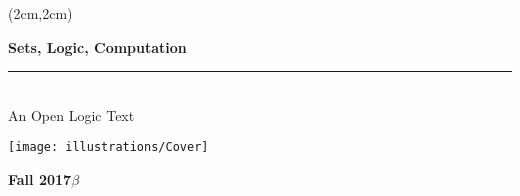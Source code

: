 \documentclass[11pt,openany]{memoir}
\begin{document}

\thispagestyle{empty}

  \pagecolor{leadbeater}
  \begin{textblock*}{14cm}(2cm,2cm)%
    \begin{raggedright}
      \fontsize{32pt}{34pt}\selectfont\bfseries\sffamily%
      Sets, Logic, Computation\\
      \normalfont\fontsize{18pt}{0pt}\selectfont\bfseries\itshape%
      \rule{14cm}{5pt}\\[5pt]
      An Open Logic Text
    \end{raggedright}

\vskip1cm\hskip-1cm\texttt{[image: illustrations/Cover]}

\par\noindent
\vskip 1.5cm
\normalfont\fontsize{16pt}{0pt}\selectfont\bfseries\sffamily%
\hfill Fall 2017$\beta$ %
\end{textblock*}
\

\clearpage
\setcounter{page}{1}
\nopagecolor



\end{document}
